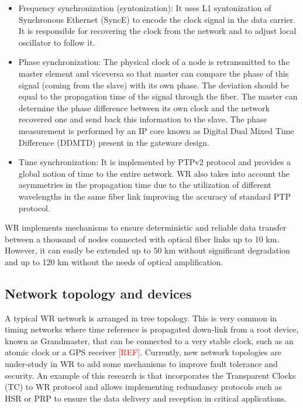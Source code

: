 \begin{itemize}
	\item {Frequency synchronization (syntonization): It uses L1 syntonization 
	of Synchronous Ethernet (SyncE) to encode the clock signal in the data 
	carrier. It is responsible for recovering the clock from the network and to 
	adjust local oscillator to follow it.}
	\item {Phase synchronization: The physical clock of a node is retransmitted to the master element and viceversa so that master can compare the phase of this signal (coming from the slave) with its own phase. The deviation should be equal to the propagation time of the signal through the fiber. The master can determine the phase difference between its own clock and the network recovered one and send back this information to the slave. The phase measurement is performed by an IP core known as Digital Dual Mixed Time Difference (DDMTD) present in the gateware design.}
	\item {Time synchronization: It is implemented by PTPv2 protocol and provides a global notion of time to the entire network. WR also takes into account the asymmetries in the propagation time due to the utilization of different wavelengths in the same fiber link improving the accuracy of standard PTP protocol.}
\end{itemize}


WR implements mechanisms to ensure deterministic and reliable data transfer 
between a thousand of nodes connected with  optical fiber links up to 10 km. 
However, it can easily be extended up to 50 km without significant degradation 
and up to 120 km without the needs of optical amplification. 

\subsection{Network topology and devices} \label{subsec:wr-net-devices}
A typical WR 
network is arranged in tree topology. This is very common in timing networks 
where time reference is propagated down-link from a root device, known as Grandmaster, that can be connected to a very stable clock, such as an atomic clock 
or a GPS receiver \textcolor{red}{[REF]}. Currently, new network topologies are under-study in WR to 
add some mechanisms to improve fault tolerance  and security. An example of 
this research is \cite{jlgutierrez-paper-redundancy} that incorporates the 
Transparent Clocks (TC) to WR protocol and allows implementing redundancy 
protocols such as HSR or PRP to ensure the data delivery and reception in 
critical applications.

